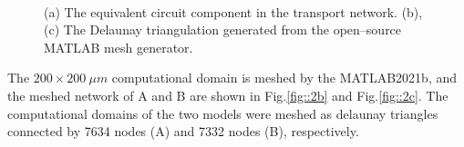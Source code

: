 \documentclass[conference]{IEEEtran}
\begin{document}
\begin{figure}[htbp]
	\centering
\\
	\caption{(a) The equivalent circuit component in the transport network. (b), (c) The Delaunay triangulation generated from the open--source MATLAB mesh generator.}
	\label{fig::2}
\end{figure}

The $200\times200~\mu m$ computational domain is meshed by the MATLAB2021b, and the meshed network of A and B are shown in Fig.\ref{fig::2b} and Fig.\ref{fig::2c}. The computational domains of the two models were meshed as delaunay triangles connected by 7634 nodes (A) and 7332 nodes (B), respectively.
\end{document}

